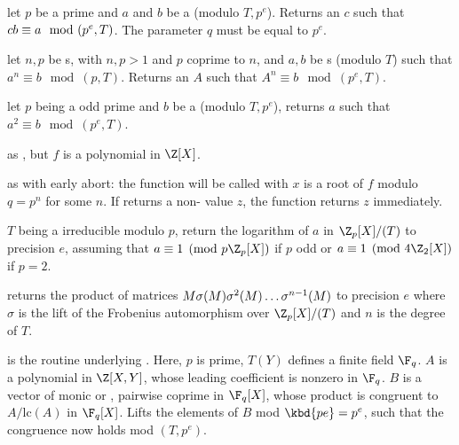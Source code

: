  let
$p$ be a prime  and $a$ and $b$ be a  (modulo $T, p^e$).
Returns an  $c$ such that $c\*b \equiv a \mod (p^e, T)$.
The parameter $q$ must be equal to $p^e$.

 let
$n,p$ be s, with $n,p > 1$ and $p$ coprime to $n$, and $a,b$
be s (modulo $T$) such that $a^n \equiv b \mod (p,T)$.
Returns an  $A$ such that $A^n \equiv b \mod (p^e, T)$.

 let
$p$ being a odd prime and $b$ be a  (modulo $T, p^e$),
returns $a$ such that $a^2 \equiv b \mod (p^e, T)$.

as , but $f$ is a polynomial in $\Z[X]$.

as  with early abort: the function 
will be called with $x$ is a root of $f$ modulo $q=p^n$ for some $n$. If
 returns a non- value $z$, the function returns $z$
immediately.

 $T$ being a 
irreducible modulo $p$, return the logarithm of $a$ in $\Z_p[X]/(T)$ to
precision $e$, assuming that $a\equiv 1 \pmod{p\Z_p[X]}$ if $p$ odd or
$a\equiv 1 \pmod{4\Z_2[X]}$ if $p=2$.




returns the product of matrices $M\*\sigma(M)\*\sigma^2(M)\ldots\sigma^{n-1}(M)$
to precision $e$ where $\sigma$ is the lift of the Frobenius automorphism
over $\Z_p[X]/(T)$ and $n$ is the degree of $T$.


 is the
routine underlying . Here, $p$ is prime, $T(Y)$ defines a
finite field $\F_q$. $A$ is a polynomial in $\Z[X,Y]$, whose leading
coefficient is nonzero in $\F_q$. $B$ is a vector of monic or ,
pairwise coprime in $\F_q[X]$, whose product is congruent to $A/\text{lc}(A)$
in $\F_q[X]$. Lifts the elements of $B$ mod $\kbd{pe} = p^e$, such that the
congruence now holds mod $(T,p^e)$.

